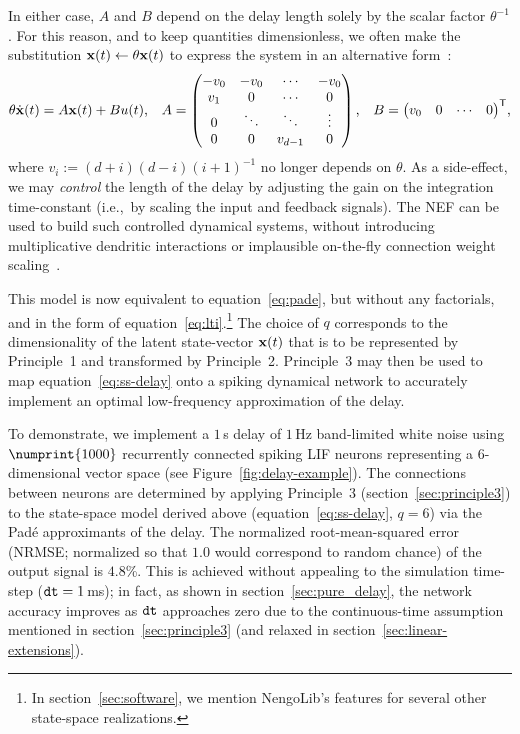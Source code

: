 In either case, $A$ and $B$ depend on the delay length solely by the scalar factor $\theta^{-1}$.
For this reason, and to keep quantities dimensionless, we often make the substitution $\mathbf{x}(t) \leftarrow \theta\mathbf{x}(t)$ to express the system in an alternative form~\citep{braindrop2019}:
\begin{equation} \label{eq:delay-system}
  \theta \dot{\mathbf{x}}(t) = A\mathbf{x}(t) + Bu(t) \text{,} \quad
  A = \begin{pmatrix} -v_0 & -v_0 & \cdots & -v_0 \\ v_1 & 0 & \cdots & 0 \\ 0 & \ddots & \ddots & \vdots \\ 0 & 0 & v_{d-1} & 0\end{pmatrix} \text{,} \quad 
  B = {\begin{pmatrix} v_0 & 0 & \cdots & 0\end{pmatrix}}^\mathsf{T} \text{,} 
\end{equation}
where $v_i := (d+i)(d-i)(i+1)^{-1}$ no longer depends on $\theta$. %
As a side-effect, we may \emph{control} the length of the delay by adjusting the gain on the integration time-constant (i.e.,~by scaling the input and feedback signals).
The NEF can be used to build such controlled dynamical systems, without introducing multiplicative dendritic interactions or implausible on-the-fly connection weight scaling~\citep{eliasmith2000b}.

This model is now equivalent to equation~\ref{eq:pade}, but without any factorials, and in the form of equation~\ref{eq:lti}.\footnote{
In section~\ref{sec:software}, we mention NengoLib's features for several other state-space realizations.}
The choice of $q$ corresponds to the dimensionality of the latent state-vector $\mathbf{x}(t)$ that is to be represented by Principle~1 and transformed by Principle~2.
Principle~3 may then be used to map equation~\ref{eq:ss-delay} onto a spiking dynamical network to accurately implement an optimal low-frequency approximation of the delay.

To demonstrate, we implement a $1$\,s delay of $1\,$Hz band-limited white noise using $\numprint{1000}$ recurrently connected spiking LIF neurons representing a $6$-dimensional vector space (see Figure~\ref{fig:delay-example}).
The connections between neurons are determined by applying Principle~3 (section~\ref{sec:principle3}) to the state-space model derived above (equation~\ref{eq:ss-delay}, $q=6$) via the Pad\'e approximants of the delay.
The normalized root-mean-squared error (NRMSE; normalized so that $1.0$ would correspond to random chance) of the output signal is $4.8$\%.
This is achieved without appealing to the simulation time-step ($\texttt{dt}{} = 1$\,ms); in fact, as shown in section~\ref{sec:pure_delay}, the network accuracy improves as $\texttt{dt}{}$ approaches zero due to the continuous-time assumption mentioned in section~\ref{sec:principle3} (and relaxed in section~\ref{sec:linear-extensions}).

